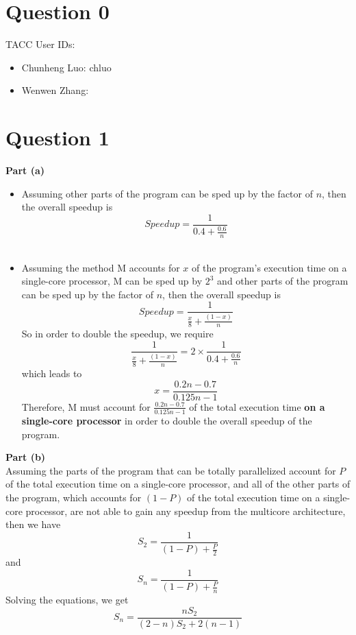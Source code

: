 \documentclass[12pt]{article}
\begin{document}
\maketitle

\section*{Question 0} 
TACC User IDs:
\begin{itemize}
\item Chunheng Luo: chluo \\
\item Wenwen Zhang:        \\
\end{itemize}

\section*{Question 1}

\textbf{Part (a)}

\begin{itemize} 
\item Assuming other parts of the program can be sped up by the factor of $n$, then the overall speedup is $$Speedup = \frac{1}{0.4+\frac{0.6}{n}}$$  \\
\item Assuming the method M accounts for $x$ of the program's execution time on a single-core processor, M can be sped up by $2^3$ and other parts of the program can be sped up by the factor of $n$, then the overall speedup is $$Speedup = \frac{1}{\frac{x}{8} + \frac{(1-x)}{n}}$$
So in order to double the speedup, we require $$\frac{1}{\frac{x}{8} + \frac{(1-x)}{n}} = 2\times\frac{1}{0.4+\frac{0.6}{n}}$$ 
which leads to $$x = \frac{0.2n - 0.7}{0.125n - 1}$$ 
Therefore, M must account for $\frac{0.2n - 0.7}{0.125n - 1}$ of the total execution time \textbf{on a single-core processor} in order to double the overall speedup of the program. 
\end{itemize}

\textbf{Part (b)} \\ 

Assuming the parts of the program that can be totally parallelized account for $P$ of the total execution time on a single-core processor, and all of the other parts of the program, which accounts for $(1-P)$ of the total execution time on a single-core processor, are not able to gain any speedup from the multicore architecture, then we have 
$$S_2 = \frac{1}{(1-P) + \frac{P}{2}}$$ and $$S_n = \frac{1}{(1-P) + \frac{P}{n}}$$
Solving the equations, we get $$S_n = \frac{nS_2}{(2-n)S_2 + 2(n-1)}$$ 
\end{document}
